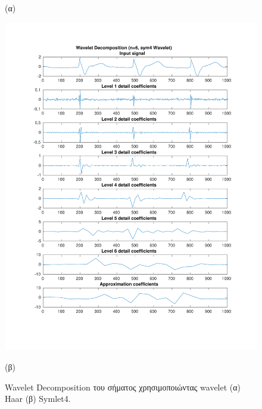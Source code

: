 \documentclass[11pt,a4paper]{article}
\begin{document}
\begin{figure}[H]
\begin{minipage}{0.48\textwidth}
	(α)
\end{minipage}
\begin{minipage}{0.48\textwidth}
	\centering
	\includegraphics[width=\textwidth]{fig/217l1_dwt2.pdf}
	
	(β)
\end{minipage}
\vfill
\caption{Wavelet Decomposition του σήματος χρησιμοποιώντας wavelet (α) Haar (β) Symlet4.}
\label{fig:217l1_dwt}
\end{figure}
\end{document}
